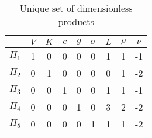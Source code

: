\documentclass{article}%
\begin{document}
%
\normalsize%


\begin{table}[!htb]%
\centering%
\caption{Unique set of dimensionless products}%
\label{tab:dimensionless-products}%
\begin{tabular}{c |  c c c c c c c c}%
 &$V$&$K$&$c$&$g$&$\sigma$&$L$&$\rho$&$\nu$\\%
\hline%
$\Pi_1$&1&0&0&0&0&1&1&{-}1\\%
$\Pi_2$&0&1&0&0&0&0&1&{-}2\\%
$\Pi_3$&0&0&1&0&0&1&1&{-}1\\%
$\Pi_4$&0&0&0&1&0&3&2&{-}2\\%
$\Pi_5$&0&0&0&0&1&1&1&{-}2\\%
\end{tabular}%
\end{table}

%
\end{document}
